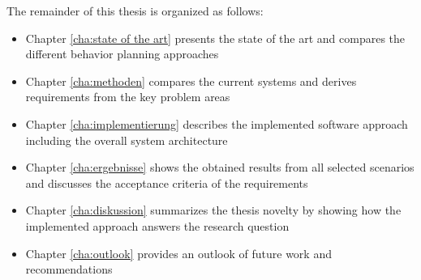 The remainder of this thesis is organized as follows:

\begin{itemize}
	\item Chapter \ref{cha:state of the art} presents the state of the art and compares the different behavior planning approaches
	
	\item Chapter \ref{cha:methoden} compares the current systems and derives requirements from the key problem areas
	
	\item Chapter \ref{cha:implementierung} describes the implemented software approach including the overall system architecture 
	
	\item Chapter \ref{cha:ergebnisse} shows the obtained results from all selected scenarios and discusses the acceptance criteria of the requirements 
	
	\item Chapter \ref{cha:diskussion} summarizes the thesis novelty by showing how the implemented approach answers the research question
	
	\item Chapter \ref{cha:outlook} provides an outlook of future work and recommendations
\end{itemize}


